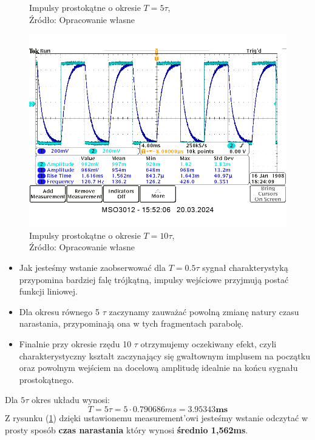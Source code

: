 \documentclass{article}
\begin{document}
\begin{figure}[!ht]
\begin{minipage}{.4\textwidth}
          \caption{Impulsy prostokątne o okresie $T = 5 \tau$,
          \\Źródło: Opracowanie własne}
          \label{fig5:impuls5T}
        \end{minipage}
      \end{figure}
      \begin{figure}[!ht]
        \centering
        \includegraphics[scale=0.25]{grafiki/10t.png}
        \caption{Impulsy prostokątne o okresie $T = 10 \tau$,
            \\Źródło: Opracowanie własne}
      \end{figure}

      \pagebreak

      \begin{itemize}
        \item Jak jesteśmy wstanie zaobserwować dla $T = 0.5 \tau$ sygnał charakterystyką przypomina bardziej falę trójkątną, impulsy wejściowe przyjmują postać funkcji liniowej.
        \item Dla okresu równego 5 $\tau$ zaczynamy zauważać powolną zmianę natury czasu narastania, przypominają ona w tych fragmentach parabolę.
        \item Finalnie przy okresie rzędu 10 $\tau$ otrzymujemy oczekiwany efekt, czyli charakterystyczny kształt zaczynający się gwałtownym implusem na początku oraz powolnym wejściem na docelową amplitudę idealnie na końcu sygnału prostokątnego.
      \end{itemize}
      Dla $5 \tau$ okres układu wynosi:
      \begin{equation}
        T = 5 \tau = 5 \cdot 0.790686ms = \mathbf{3.95343ms} 
      \end{equation}
      Z rysunku (\ref{fig5:impuls5T}) dzięki ustawionemu measurement'owi jesteśmy wstanie odczytać w prosty sposób \textbf{czas narastania} który wynosi \textbf{średnio 1,562ms}.
\end{document}

